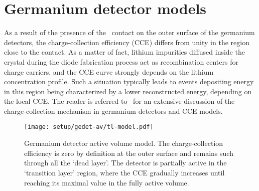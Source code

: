 
\chapter{Germanium detector models}%
\label{apdx:gedetav}

As a result of the presence of the \nplus\ contact on the outer surface of the germanium
detectors, the charge-collection efficiency (CCE) differs from unity in the region close
to the contact. As a matter of fact, lithium impurities diffused inside the crystal during
the diode fabrication process act as recombination centers for charge carriers, and the
CCE curve strongly depends on the lithium concentration profile. Such a situation
typically leads to events depositing energy in this region being characterized by a lower
reconstructed energy, depending on the local CCE. The reader is referred
to~\cite{Lehnert2016} for an extensive discussion of the charge-collection mechanism in
germanium detectors and CCE models.

\begin{figure}
  \centering
  \texttt{[image: setup/gedet-av/tl-model.pdf]}
  \caption{%
    Germanium detector active volume model. The charge-collection efficiency is zero by
    definition at the outer surface and remains such through all the `dead layer'. The
    detector is partially active in the `transition layer' region, where the CCE gradually
    increases until reaching its maximal value in the fully active volume.
  }\label{fig:gedetav:tl-model}
\end{figure}


